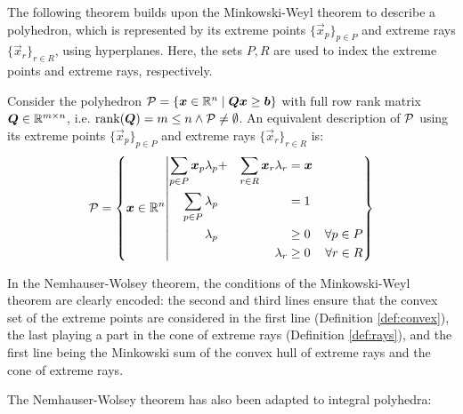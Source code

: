 The following theorem builds upon the Minkowski-Weyl theorem to describe a polyhedron, which is represented by its extreme points $\{\vec{x}_p\}_{p \in P}$ and extreme rays $\{\vec{x}_r\}_{r \in R}$, using hyperplanes. Here, the sets $P, R$ are used to index the extreme points and extreme rays, respectively.

\begin{theorem}\label{th:nemhauser-wolsey}
Consider the polyhedron $\mathcal{P} = \{{\bm{x}} \in \mathbb{R}^n \mid {\bm{Q}} {\bm{x}} \geq {\bm{b}}\}$ with full row rank matrix ${\bm{Q}} \in \mathbb{R}^{m \times n}$, i.e. $\operatorname{rank}({\bm{Q}}) = m \leq n \land \mathcal{P} \neq \emptyset$.
An equivalent description of $\mathcal{P}$ using its extreme points $\{\vec{x}_p\}_{p \in P}$ and extreme rays $\{\vec{x}_r\}_{r \in R}$ is:
\begin{equation}
\mathcal{P} = \left\{ {\bm{x}} \in \mathbb{R}^n \middle\vert
\begin{aligned}
\sum_{p \in P} {\bm{x}}_p \lambda_p &+ &\sum_{r \in R} {\bm{x}}_r \lambda_r &= {\bm{x}} &\\
\sum_{p \in P} \lambda_p & & &= 1 &\\
\lambda_p & & &\geq 0 &\forall p \in P\\
& &\lambda_r &\geq 0 &\forall r \in R
\end{aligned}
\right\}
\end{equation}
\end{theorem}

In the Nemhauser-Wolsey theorem, the conditions of the Minkowski-Weyl theorem are clearly encoded: the second and third lines ensure that the convex set of the extreme points are considered in the first line (Definition \ref{def:convex}), the last playing a part in the cone of extreme rays (Definition \ref{def:rays}), and the first line being the Minkowski sum of the convex hull of extreme rays and the cone of extreme rays.

The Nemhauser-Wolsey theorem has also been adapted to integral polyhedra:


